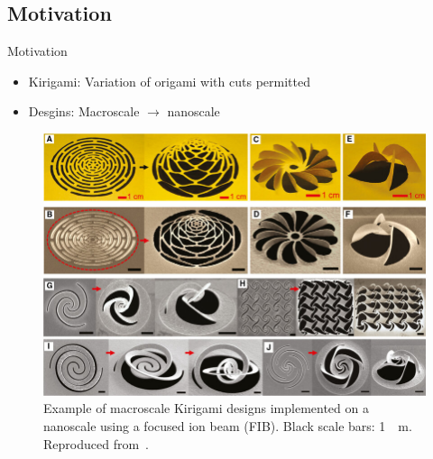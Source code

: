 \documentclass[
	10pt, %
]{beamer}
\begin{document}
\subsection{Motivation}
\begin{frame}{Motivation}
	\begin{itemize}
		\item Kirigami: Variation of origami with cuts permitted
		\item Desgins: Macroscale $\to$ nanoscale
	\end{itemize}
	\vspace*{10px}

	\begin{figure}
		\includegraphics[height=0.55\textheight]{figures/kirigami_example.jpg}
		\caption{Example of macroscale Kirigami designs implemented on a nanoscale using a focused ion beam (FIB). Black scale bars: \SI{1}{\mu m}. Reproduced from~\cite{Li_2018}.}
	\end{figure}	
\end{frame}
%
%
\end{document}
